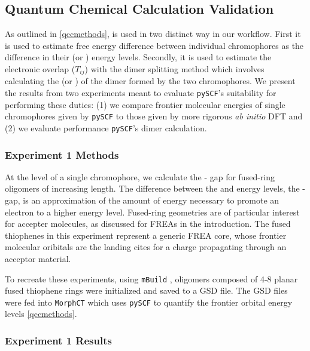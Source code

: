 \subsection{Quantum Chemical Calculation Validation}

As outlined in \autoref{qccmethods},  is used in two distinct way in our workflow. 
First it is used to estimate free energy
difference between individual chromophores as the difference in their  (or ) energy levels.
Secondly, it is used to estimate the electronic overlap ($T_{ij}$) with the dimer splitting method which involves
calculating the  (or ) of the dimer formed by the two chromophores. We present the results from two
experiments meant to evaluate \texttt{pySCF}'s suitability for performing these duties:
(1) we compare frontier molecular energies of single chromophores given by \texttt{pySCF} to those
given by more rigorous \textit{ab initio} DFT and (2) we evaluate performance \texttt{pySCF}'s dimer calculation.

\subsubsection{Experiment 1 Methods}

At the level of a single chromophore, we calculate the - gap for fused-ring
oligomers of increasing length. 
The difference between the  and  energy levels, the - gap, is an approximation of the amount
of energy necessary to promote an electron to a higher energy level.  
Fused-ring geometries are of particular interest for accepter
molecules, as discussed for FREAs in the introduction. 
The fused thiophenes in this experiment represent a generic FREA core, whose frontier molecular oribitals are
the landing cites for a charge propagating through an acceptor material. 

To recreate these experiments, using \texttt{mBuild} \cite{Klein2016}, oligomers composed of 4-8 planar fused thiophene rings
were initialized and saved to a GSD file. The GSD files were fed into \texttt{MorphCT} which uses \texttt{pySCF} to quantify the
frontier orbital energy levels \autoref{qccmethods}.

\subsubsection{Experiment 1 Results}

